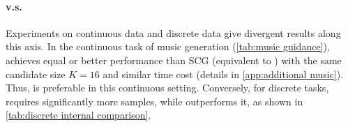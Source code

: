 \paragraph{\xtsampling v.s. \xcleansampling} Experiments on continuous data and discrete data give divergent results along this axis. In the continuous task of music generation (\cref{tab:music guidance}), \xcleansampling achieves equal or better performance than SCG (equivalent to \xtsampling) with the same candidate size $K=16$ and similar time cost (details in \cref{app:additional music}). Thus, \xcleansampling is preferable in this continuous setting. Conversely, for discrete tasks, \xcleansampling requires significantly more samples, while \xtsampling outperforms it, as shown in \cref{tab:discrete internal comparison}.





\begin{table}[ht]
    \centering
    
    \setlength{\tabcolsep}{3pt} %
    \caption{Comparison of results across \xtgrad, \xtsampling and \xcleansampling. For molecule generation, the target is specified as the number of rings $N_r = 2$. For enhancer DNA design, the results correspond to Class 1.}
    \label{tab:discrete internal comparison}
\end{table}

